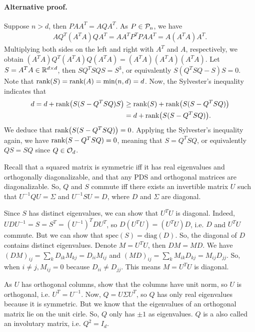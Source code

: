 \paragraph{Alternative proof.} Suppose $n > d$, then $P A A^T = A Q A^T$. As $P \in \mathcal P_n$, we have
\begin{align}
  A Q^T (A^T A) Q A^T = A A^T P^T P A A^T = A (A^T A) A^T.
\end{align}
Multiplying both sides on the left and right with $A^T$ and $A$, respectively, we obtain
$(A^T A) Q^T (A^T A) Q (A^T A) = (A^T A) (A^T A) (A^T A)$. Let $S = A^T A \in \mathbb R^{d \times d}$, then
$S Q^T S Q S = S^3$, or equivalently $S (Q^T S Q - S) S = 0$. Note that $\text{rank}(S) = \text{rank}(A) = \min(n,d) = d$.
Now, the Sylvester's inequality indicates that
\begin{align*}
    d = d + \text{rank}\big( S (S - Q^T S Q) S \big) &\geq \text{rank}(S) + \text{rank}\big( S (S - Q^T S Q) \big) \\
    &= d + \text{rank} \big( S (S - Q^T S Q) \big).
\end{align*}
We deduce that $\text{rank} \big(S (S - Q^T S Q) \big) = 0$. Applying the Sylvester's inequality again,
we have $\text{rank}(S - Q^T S Q) = 0$, meaning that $S = Q^T S Q$, or equivalently $QS = SQ$ since $Q \in \mathcal O_d$.

Recall that a squared matrix is symmetric iff it has real eigenvalues and orthogonally diagonalizable, and that
any PDS and orthogonal matrices are diagonalizable. So, $Q$ and $S$ commute iff there exists an invertible matrix
$U$ such that $U^{-1} Q U = \Sigma$ and $U^{-1} S U = D$, where $D$ and $\Sigma$ are diagonal.

Since $S$ has distinct eigenvalues, we can show that $U^T U$ is diagonal.
Indeed, $U D U^{-1} = S = S^T = (U^{-1})^T D U^T$, so $D (U^T U) = (U^T U) D$, i.e. $D$ and $U^T U$ commute. But
we can show that $\text{spec}(S) = \text{diag}(D)$. So, the diagonal of $D$ contains distinct
eigenvalues. Denote $M = U^T U$, then $DM = MD$. We have $(DM)_{ij} = \sum_k D_{ik} M_{kj} = D_{ii} M_{ij}$ and
$(MD)_{ij} = \sum_k M_{ik} D_{kj} = M_{ij} D_{jj}$. So, when $i \neq j, M_{ij} = 0$ because
$D_{ii} \neq D_{jj}$. This means $M = U^T U$ is diagonal.

As $U$ has orthogonal columns, show that the columns have unit norm, so $U$ is orthogonal, i.e. $U^T = U^{-1}$.
Now, $Q = U \Sigma U^T$, so $Q$ has only real eigenvalues because it is symmetric.
But we know that the eigenvalues of an orthogonal matrix lie on
the unit cirle. So, $Q$ only has $\pm 1$ as eigenvalues. $Q$ is a also called an involutary matrix, i.e. $Q^2 = I_d$.

